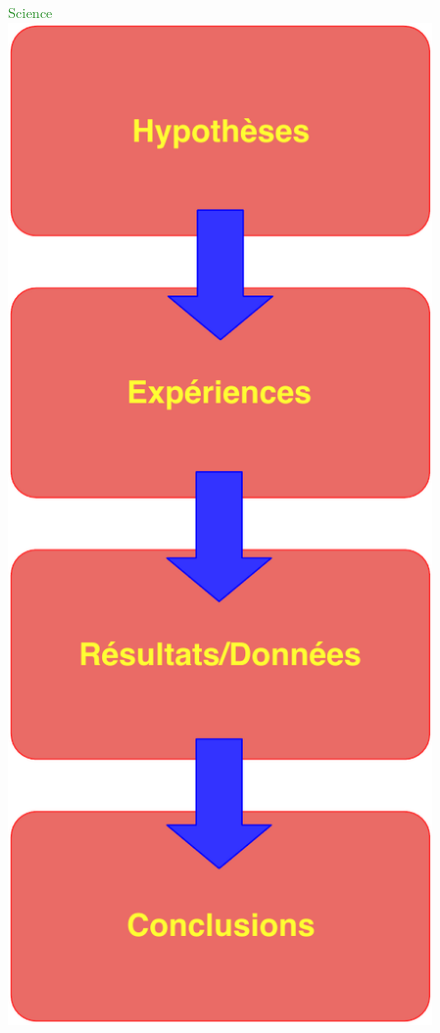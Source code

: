 \documentclass[usenames, dvipsnames]{beamer}
\begin{document}
\begin{frame}[plain]
\frametitle{}

\begin{figure}
\begin{minipage}[c]{.46\linewidth}
\centering
\textcolor{ForestGreen}{Science}
\hspace{3em}\includegraphics[scale=.4]{images/enth/th4.pdf}

\end{minipage}
\end{figure}
\end{frame}
\end{document}
